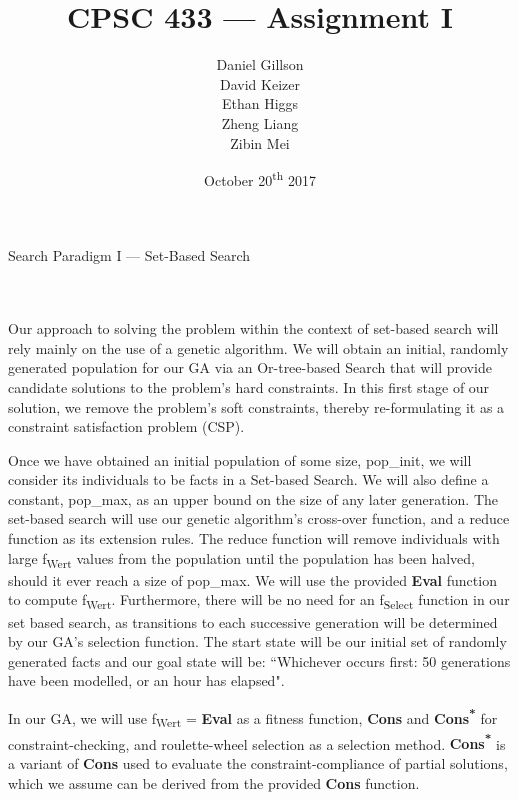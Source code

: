 \documentclass[11pt, oneside]{article}   	%
\title{\vspace{40mm}CPSC 433 --- Assignment I}
\author{
	Daniel Gillson\\
	David Keizer\\
	Ethan Higgs\\
	Zheng Liang\\
	Zibin Mei}
\date{October 20\textsuperscript{th} 2017}
\newenvironment{cmr}{\fontfamily{cmr}\selectfont}{\par}
\begin{document}
\maketitle
\break

\centerline{{\Large Search Paradigm I --- Set-Based Search}}

\\\\
\begin{cmr}
\indent Our approach to solving the problem within the context of set-based search will rely mainly on the use of a genetic algorithm.
We will obtain an initial, randomly generated population for our GA via an Or-tree-based Search that will provide candidate solutions to the problem's
hard constraints. In this first stage of our solution, we remove the problem's soft constraints, thereby re-formulating it as a constraint satisfaction problem (CSP).

\indent Once we have obtained an initial population of some size, pop_init, we will consider its individuals to be facts in a Set-based Search.
We will also define a constant, pop_max, as an upper bound on the size of any later generation.
The set-based search will use our genetic algorithm's cross-over function, and a reduce function as its extension rules.
The reduce function will remove individuals with large f\textsubscript{Wert} values from the population until the population has been halved, should it ever reach a size of pop_max.
We will use the provided \textbf{Eval} function to compute f\textsubscript{Wert}. Furthermore, there will be no need for an f\textsubscript{Select} function in our set based search, as
transitions to each successive generation will be determined by our GA's selection function.
The start state will be our initial set of randomly generated facts and our goal state will be: ``Whichever occurs first: 50 generations have been modelled, or an hour has elapsed".

\indent In our GA, we will use f\textsubscript{Wert} = \textbf{Eval} as a fitness function, \textbf{Cons} and \textbf{Cons\textsuperscript{*}} for constraint-checking, and roulette-wheel selection as a selection method.
\textbf{Cons\textsuperscript{*}} is a variant of \textbf{Cons} used to evaluate the constraint-compliance of partial solutions, which we assume can be derived from the provided \textbf{Cons} function.
\end{cmr}

\end{document}
